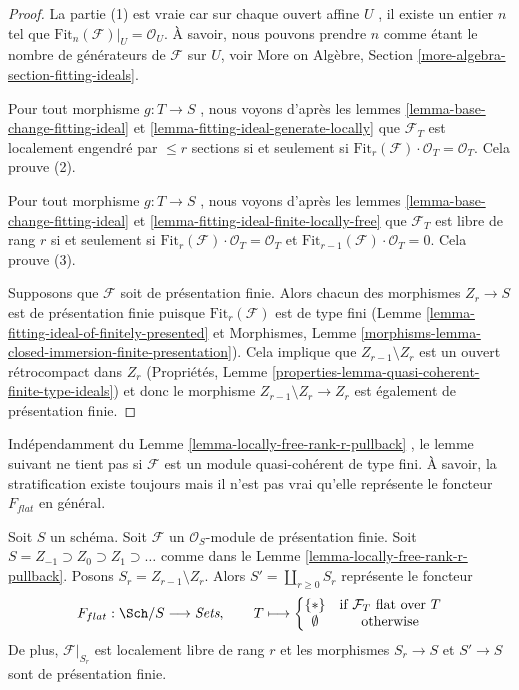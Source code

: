 \begin{proof}
La partie (1) est vraie car sur chaque ouvert affine  $U$ , il existe un
entier  $n$  tel que  $\text{Fit}_n(\mathcal{F})|_U = \mathcal{O}_U$. À savoir, nous pouvons prendre
 $n$  comme étant le nombre de générateurs de  $\mathcal{F}$  sur
 $U$, voir More on Algèbre, Section  \ref{more-algebra-section-fitting-ideals}.

\medskip\noindent
Pour tout morphisme  $g : T \to S$ , nous voyons d'après les lemmes  \ref{lemma-base-change-fitting-ideal}  et
 \ref{lemma-fitting-ideal-generate-locally}  que  $\mathcal{F}_T$  est localement engendré par  $\leq r$  sections si
et seulement si  $\text{Fit}_r(\mathcal{F}) \cdot \mathcal{O}_T = \mathcal{O}_T$. Cela prouve (2).

\medskip\noindent
Pour tout morphisme  $g : T \to S$ , nous voyons d'après les lemmes  \ref{lemma-base-change-fitting-ideal}  et
 \ref{lemma-fitting-ideal-finite-locally-free}  que  $\mathcal{F}_T$  est libre de rang  $r$  si et seulement si
 $\text{Fit}_r(\mathcal{F}) \cdot \mathcal{O}_T = \mathcal{O}_T$  et  $\text{Fit}_{r - 1}(\mathcal{F}) \cdot \mathcal{O}_T = 0$. Cela prouve (3).

\medskip\noindent
Supposons que  $\mathcal{F}$  soit de présentation finie. Alors chacun des morphismes
 $Z_r \to S$  est de présentation finie puisque  $\text{Fit}_r(\mathcal{F})$  est de type fini
(Lemme  \ref{lemma-fitting-ideal-of-finitely-presented}  et Morphismes, Lemme  \ref{morphisms-lemma-closed-immersion-finite-presentation}). Cela implique que
 $Z_{r - 1} \setminus Z_r$  est un ouvert rétrocompact dans  $Z_r$  (Propriétés, Lemme
 \ref{properties-lemma-quasi-coherent-finite-type-ideals}) et donc le morphisme  $Z_{r - 1} \setminus Z_r \to Z_r$  est également de présentation
finie.
\end{proof}

\noindent
Indépendamment du Lemme  \ref{lemma-locally-free-rank-r-pullback} , le lemme suivant ne tient pas si
 $\mathcal{F}$  est un module quasi-cohérent de type fini. À savoir, la
stratification existe toujours mais il n'est pas vrai qu'elle représente le
foncteur  $F_{flat}$  en général.

\begin{lemma}
\label{lemma-finite-presentation-module}
Soit  $S$  un schéma. Soit  $\mathcal{F}$  un  $\mathcal{O}_S$-module de
présentation finie. Soit  $S = Z_{-1} \supset Z_0 \supset Z_1 \supset \ldots$  comme dans le Lemme  \ref{lemma-locally-free-rank-r-pullback}. Posons
 $S_r = Z_{r - 1} \setminus Z_r$. Alors  $S' = \coprod_{r \geq 0} S_r$  représente le foncteur
$$
F_{flat} : \Sch/S \longrightarrow \textit{Sets},\quad\quad
T \longmapsto
\left\{
\begin{matrix}
\{*\} & \text{if }\mathcal{F}_T\text{ flat over }T\\
\emptyset & \text{otherwise}
\end{matrix}
\right.
$$
De plus,  $\mathcal{F}|_{S_r}$  est localement libre de rang  $r$  et les morphismes
 $S_r \to S$  et  $S' \to S$  sont de présentation finie.
\end{lemma}

